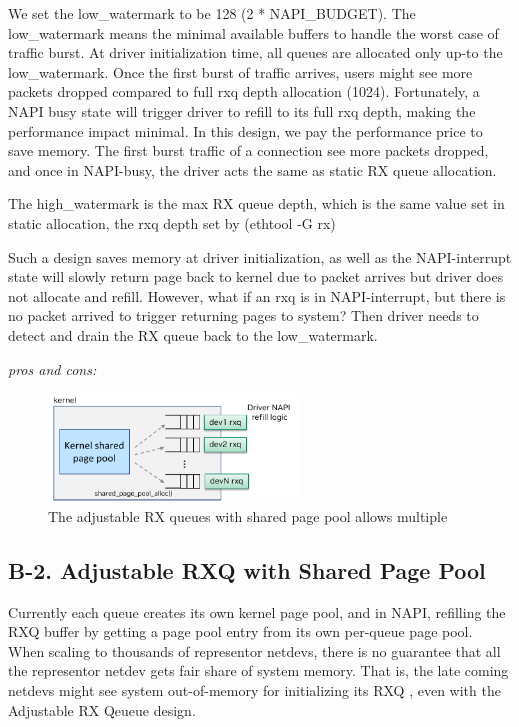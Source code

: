\documentclass[letterpaper]{article}
\begin{document}
We set the low\_watermark to be 128 (2 * NAPI\_BUDGET). 
The low\_watermark means the minimal available buffers to handle the
worst case of traffic burst. At driver initialization time, all queues
are allocated only up-to the low\_watermark. Once the first burst
of traffic arrives, users might see more packets dropped compared
to full rxq depth allocation (1024). Fortunately, a NAPI busy state will
trigger driver to refill to its full rxq depth, making the performance
impact minimal. In this design, we pay the performance price to save
memory. The first burst traffic of a connection see more packets dropped,
and once in NAPI-busy, the driver acts the same as static RX queue
allocation.

The high\_watermark is the max RX queue depth, which is the same value
set in static allocation, the rxq depth set by (ethtool -G rx)

Such a design saves memory at driver initialization, as well as the
NAPI-interrupt
state will slowly return page back to kernel due to packet arrives but
driver does not allocate and refill. However, what if an rxq is in
NAPI-interrupt, but there is no packet arrived to trigger returning
pages to system? Then driver needs to detect and drain the RX queue
back to the low\_watermark.

\textit{pros and cons:} 

\begin{figure}[h]
\includegraphics[width=2.6in]{shared_page_pool.pdf}
\centering
\caption{The adjustable RX queues with shared page pool allows multiple}
\label{fig:shared_page_pool}
\end{figure}

\subsection{B-2. Adjustable RXQ with Shared Page Pool}
Currently each queue creates its own kernel page pool, and in NAPI, refilling
the RXQ buffer by getting a page pool entry from its own per-queue page pool.
When scaling to thousands of representor netdevs, there is no guarantee that
all the representor netdev gets fair share of system memory. That is, the late
coming netdevs might see system out-of-memory for initializing its RXQ ,
even with the Adjustable RX Qeueue design.
\end{document}
